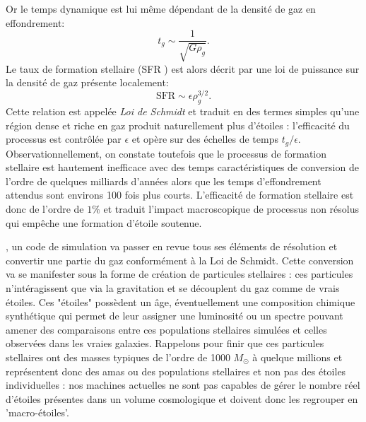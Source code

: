 Or le temps dynamique est lui même dépendant de la densité de gaz en effondrement:
\begin{equation}
t_g\sim\frac{1}{\sqrt{G\rho_g}}.
\end{equation}
Le taux de formation stellaire (SFR ) est alors décrit par une loi de puissance sur la densité de gaz présente localement:
\begin{equation}
\mathrm{SFR}\sim \epsilon \rho_g^{3/2}.
\label{e:schmidt}
\end{equation}
Cette relation est appelée \textit{Loi de Schmidt} et traduit en des termes simples qu'une région dense et riche en gaz produit naturellement plus d'étoiles : l'efficacité du processus est contrôlée par $\epsilon$ et opère sur des échelles de temps $t_g/\epsilon$. Observationnellement, on constate toutefois que le processus de formation stellaire est hautement inefficace avec des temps caractéristiques de conversion de l'ordre de quelques milliards d'années alors que les temps d'effondrement attendus sont environs 100 fois plus courts. L'efficacité de formation stellaire est donc de l'ordre de $1\%$ et traduit l'impact macroscopique de processus non résolus qui empêche une formation d'étoile soutenue.

, un code de simulation va passer en revue tous ses éléments de résolution et convertir une partie du gaz conformément à la Loi de Schmidt. Cette conversion va se manifester sous la forme de création de particules stellaires : ces particules n'intéragissent que via la gravitation et se découplent du gaz comme de vrais étoiles. Ces "étoiles" possèdent un âge, éventuellement une composition chimique synthétique qui permet de leur assigner une luminosité ou un spectre pouvant amener des comparaisons entre ces populations stellaires simulées et celles observées dans les vraies galaxies. Rappelons pour finir que ces particules stellaires ont des masses typiques de l'ordre de 1000 $M_\odot$ à quelque millions et représentent donc des amas ou des populations stellaires et non pas des étoiles individuelles : nos machines actuelles ne sont pas capables de gérer le nombre réel d'étoiles présentes dans un volume cosmologique et doivent donc les regrouper en 'macro-étoiles'.

